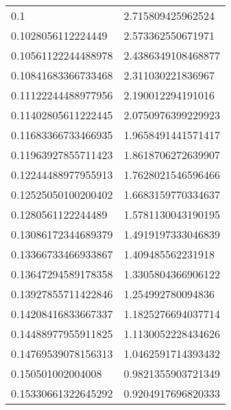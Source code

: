 \tiny
{}
\begin{supertabular}{ll}
0.1                 & 2.715809425962524     \\
0.1028056112224449  & 2.573362550671971     \\
0.10561122244488978 & 2.4386349108468877    \\
0.10841683366733468 & 2.311030221836967     \\
0.11122244488977956 & 2.190012294191016     \\
0.11402805611222445 & 2.0750976399229923    \\
0.11683366733466935 & 1.9658491441571417    \\
0.11963927855711423 & 1.8618706272639907    \\
0.12244488977955913 & 1.7628021546596466    \\
0.12525050100200402 & 1.6683159770334637    \\
0.1280561122244489  & 1.5781130043190195    \\
0.13086172344689379 & 1.4919197333046839    \\
0.13366733466933867 & 1.409485562231918     \\
0.13647294589178358 & 1.3305804366906122    \\
0.13927855711422846 & 1.254992780094836     \\
0.14208416833667337 & 1.1825276694037714    \\
0.14488977955911825 & 1.1130052228434626    \\
0.14769539078156313 & 1.0462591714393432    \\
0.150501002004008   & 0.9821355903721349    \\
0.15330661322645292 & 0.9204917696820333    \\
\end{supertabular} \tablehead{}
